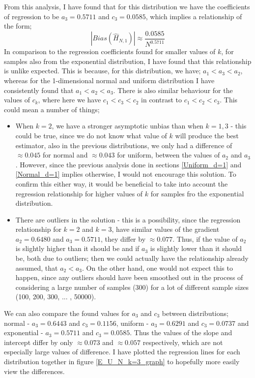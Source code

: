 \documentclass{article}
\begin{document}
From this analysis, I have found that for this distribution we have the coefficients of regression to be $a_{3} = 0.5711$ and $c_{3}=0.0585$, which implies a relationship of the form;
\begin{equation}
|Bias(\hat{H}_{N, 1})| \approx \frac{0.0585}{N^{0.5711}}\nonumber
\end{equation}
In comparison to the regression coefficients found for smaller values of $k$, for samples also from the exponential distribution, I have found that this relationship is unlike expected. This is because, for this distribution, we have; $a_{1} < a_{3} < a_{2}$, whereas for the 1-dimensional normal and uniform distribution I have consistently found that  $a_{1} < a_{2} < a_{3}$. There is also similar behaviour for the values of $c_{k}$, where here we have  $c_{1} < c_{3} < c_{2}$ in contrast to  $c_{1} < c_{2} < c_{3}$. This could mean a number of things;
\begin{itemize}
\item When $k=2$, we have a stronger asymptotic unbias than when $k=1, 3$ - this could be true, since we do not know what value of $k$ will produce the best estimator, also in the previous distributions, we only had a difference of $\approx 0.045$ for normal and $\approx 0.043$ for uniform, between the values of $a_{2}$ and $a_{3}$. However, since the previous analysis done in sections \ref{Uniform_d=1} and \ref{Normal_d=1} implies otherwise, I would not encourage this solution. To confirm this either way, it would be beneficial to take into account the regression relationship for higher values of $k$ for samples fro the exponential distribution.

\item There are outliers in the solution - this is a possibility, since the regression relationship for $k=2$ and $k=3$, have similar values of the gradient $a_{2} = 0.6480$ and $a_{3}=0.5711$, they differ by $\approx 0.077$. Thus, if the value of $a_{2}$ is slightly higher than it should be and if $a_{3}$ is slightly lower than it should be, both due to outliers; then we could actually have the relationship already assumed, that $a_{2} < a_{3}$. On the other hand, one would not expect this to happen, since any outliers should have been smoothed out in the process of considering a large number of samples (300) for a lot of different sample sizes (100, 200, 300, ... , 50000).

\end{itemize}

We can also compare the found values for $a_{3}$ and $c_{3}$ between distributions; normal - $a_{3}=0.6443$ and $c_{3}=0.1156$, uniform - $a_{3}=0.6291$ and $c_{3}=0.0737$ and exponential - $a_{3}=0.5711$ and $c_{3}=0.0585$. Thus the values of the slope and intercept differ by only $\approx 0.073$ and $\approx 0.057$ respectively, which are not especially large values of difference. I have plotted the regression lines for each distribution together in figure \ref{E_U_N_k=3_graph} to hopefully more easily view the differences.
\end{document}
